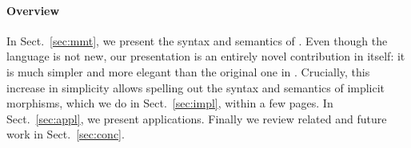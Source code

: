 \paragraph{Overview}
In Sect.~\ref{sec:mmt}, we present the syntax and semantics of \mmt.
Even though the \mmt language is not new, our presentation is an entirely novel contribution in itself: it is much simpler and more elegant than the original one in \cite{RK:mmt:10}.
%
Crucially, this increase in simplicity allows spelling out the syntax and semantics of implicit morphisms, which we do in Sect.~\ref{sec:impl}, within a few pages.
In Sect.~\ref{sec:appl}, we present applications.
Finally we review related and future work in Sect.~\ref{sec:conc}.

